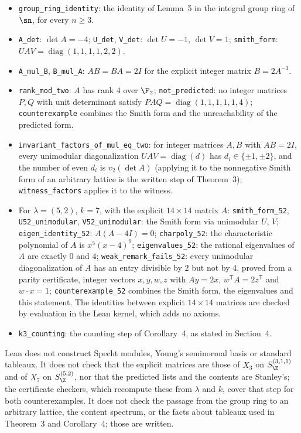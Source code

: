 \begin{itemize}\itemsep0pt
\item \texttt{group\_ring\_identity}: the identity of
Lemma~5 in the integral group ring of $\sn$, for every
$n\ge3$.
\item \texttt{A\_det}: $\det A=-4$; \texttt{U\_det}, \texttt{V\_det}:
$\det U=-1$, $\det V=1$; \texttt{smith\_form}:
$UAV=\operatorname{diag}(1,1,1,1,2,2)$.
\item \texttt{A\_mul\_B}, \texttt{B\_mul\_A}: $AB=BA=2I$ for the explicit
integer matrix $B=2A^{-1}$.
\item \texttt{rank\_mod\_two}: $A$ has rank $4$ over $\F_2$;
\texttt{not\_predicted}: no integer matrices $P,Q$ with unit determinant
satisfy $PAQ=\operatorname{diag}(1,1,1,1,1,4)$; \texttt{counterexample}
combines the Smith form and the unreachability of the predicted form.
\item \texttt{invariant\_factors\_of\_mul\_eq\_two}: for integer matrices
$A,B$ with $AB=2I$, every unimodular diagonalization $UAV=\operatorname{diag}(d)$
has $d_i\in\{\pm1,\pm2\}$, and the number of even $d_i$ is $v_2(\det A)$
(applying it to the nonnegative Smith form of an arbitrary lattice is the
written step of Theorem~3); \texttt{witness\_factors} applies it
to the witness.
\item For $\lambda=(5,2)$, $k=7$, with the explicit $14\times14$ matrix $A$:
\texttt{smith\_form\_52}, \texttt{U52\_unimodular},
\texttt{V52\_unimodular}: the Smith form via unimodular $U$, $V$;
\texttt{eigen\_identity\_52}: $A(A-4I)=0$; \texttt{charpoly\_52}: the
characteristic polynomial of $A$ is $x^5(x-4)^9$; \texttt{eigenvalues\_52}:
the rational eigenvalues of $A$ are exactly $0$ and $4$;
\texttt{weak\_remark\_fails\_52}: every unimodular diagonalization of $A$
has an entry divisible by $2$ but not by $4$, proved from a parity certificate,
integer vectors $x,y,w,z$ with $Ay=2x$, $w^{\mathsf T}A=2z^{\mathsf T}$ and
$w\cdot x=1$; \texttt{counterexample\_52} combines the Smith form, the
eigenvalues and this statement. The identities between explicit
$14\times14$ matrices are checked by evaluation in the Lean kernel, which
adds no axioms.
\item \texttt{k3\_counting}: the counting step of Corollary~4, as
stated in Section~4.
\end{itemize}
Lean does not construct Specht modules, Young's seminormal basis or standard
tableaux. It does not check that the explicit matrices are those of $X_3$ on
$S^{(3,1,1)}_\Z$ and of $X_7$ on $S^{(5,2)}_\Z$, nor that the predicted lists
and the contents are Stanley's; the certificate checkers, which recompute
these from $\lambda$ and $k$, cover that step for both counterexamples. It does not check the passage from the group ring to an
arbitrary lattice, the content spectrum, or the facts about tableaux used in
Theorem~3 and Corollary~4; those are written.\par\fussy




